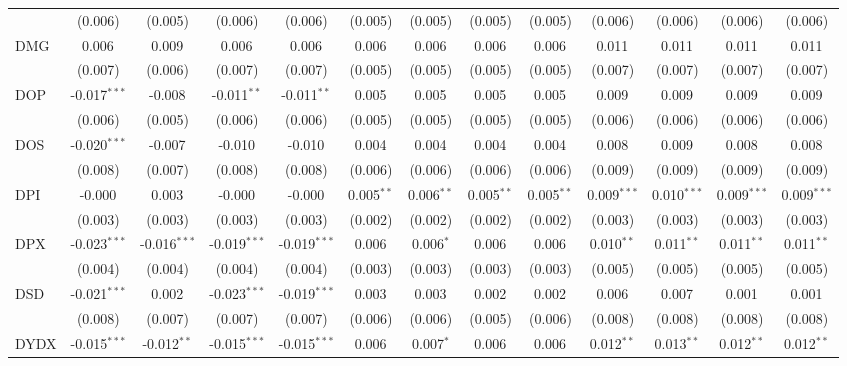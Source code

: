\begin{table}[!htbp]
\begin{tabular}{@{\extracolsep{5pt}}lcccccccccccc}
  & (0.006) & (0.005) & (0.006) & (0.006) & (0.005) & (0.005) & (0.005) & (0.005) & (0.006) & (0.006) & (0.006) & (0.006) \\
 DMG & 0.006$^{}$ & 0.009$^{}$ & 0.006$^{}$ & 0.006$^{}$ & 0.006$^{}$ & 0.006$^{}$ & 0.006$^{}$ & 0.006$^{}$ & 0.011$^{}$ & 0.011$^{}$ & 0.011$^{}$ & 0.011$^{}$ \\
  & (0.007) & (0.006) & (0.007) & (0.007) & (0.005) & (0.005) & (0.005) & (0.005) & (0.007) & (0.007) & (0.007) & (0.007) \\
 DOP & -0.017$^{***}$ & -0.008$^{}$ & -0.011$^{**}$ & -0.011$^{**}$ & 0.005$^{}$ & 0.005$^{}$ & 0.005$^{}$ & 0.005$^{}$ & 0.009$^{}$ & 0.009$^{}$ & 0.009$^{}$ & 0.009$^{}$ \\
  & (0.006) & (0.005) & (0.006) & (0.006) & (0.005) & (0.005) & (0.005) & (0.005) & (0.006) & (0.006) & (0.006) & (0.006) \\
 DOS & -0.020$^{***}$ & -0.007$^{}$ & -0.010$^{}$ & -0.010$^{}$ & 0.004$^{}$ & 0.004$^{}$ & 0.004$^{}$ & 0.004$^{}$ & 0.008$^{}$ & 0.009$^{}$ & 0.008$^{}$ & 0.008$^{}$ \\
  & (0.008) & (0.007) & (0.008) & (0.008) & (0.006) & (0.006) & (0.006) & (0.006) & (0.009) & (0.009) & (0.009) & (0.009) \\
 DPI & -0.000$^{}$ & 0.003$^{}$ & -0.000$^{}$ & -0.000$^{}$ & 0.005$^{**}$ & 0.006$^{**}$ & 0.005$^{**}$ & 0.005$^{**}$ & 0.009$^{***}$ & 0.010$^{***}$ & 0.009$^{***}$ & 0.009$^{***}$ \\
  & (0.003) & (0.003) & (0.003) & (0.003) & (0.002) & (0.002) & (0.002) & (0.002) & (0.003) & (0.003) & (0.003) & (0.003) \\
 DPX & -0.023$^{***}$ & -0.016$^{***}$ & -0.019$^{***}$ & -0.019$^{***}$ & 0.006$^{}$ & 0.006$^{*}$ & 0.006$^{}$ & 0.006$^{}$ & 0.010$^{**}$ & 0.011$^{**}$ & 0.011$^{**}$ & 0.011$^{**}$ \\
  & (0.004) & (0.004) & (0.004) & (0.004) & (0.003) & (0.003) & (0.003) & (0.003) & (0.005) & (0.005) & (0.005) & (0.005) \\
 DSD & -0.021$^{***}$ & 0.002$^{}$ & -0.023$^{***}$ & -0.019$^{***}$ & 0.003$^{}$ & 0.003$^{}$ & 0.002$^{}$ & 0.002$^{}$ & 0.006$^{}$ & 0.007$^{}$ & 0.001$^{}$ & 0.001$^{}$ \\
  & (0.008) & (0.007) & (0.007) & (0.007) & (0.006) & (0.006) & (0.005) & (0.006) & (0.008) & (0.008) & (0.008) & (0.008) \\
 DYDX & -0.015$^{***}$ & -0.012$^{**}$ & -0.015$^{***}$ & -0.015$^{***}$ & 0.006$^{}$ & 0.007$^{*}$ & 0.006$^{}$ & 0.006$^{}$ & 0.012$^{**}$ & 0.013$^{**}$ & 0.012$^{**}$ & 0.012$^{**}$ \\

\end{tabular}
\end{table}
